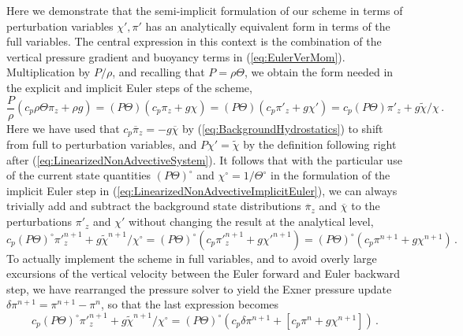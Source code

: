 \documentclass{ametsoc}
\newcommand{\sblue}[1]{\textcolor{sblue}{#1}}
\newcommand{\revision}[1]{\sblue{#1}}
\theoremstyle{definition}
\newcommand{\eq}[1]{(\ref{#1})}
\newcommand{\chibar}{\overline{\chi}}
\newcommand{\chitilde}{{\widetilde \chi}}
\newcommand{\pibar}{\overline{\pi}}
\begin{document}
\begin{appendix}[C]\label{sec:appC}%

\revision{Here we demonstrate that the semi-implicit formulation of our scheme in terms of perturbation variables $\chi', \pi'$ has an analytically equivalent form in terms of the full variables. The central expression in this context is the combination of the vertical pressure gradient and buoyancy terms in \eq{eq:EulerVerMom}. Multiplication by $P/\rho$, and recalling that $P = \rho\Theta$, we obtain the form needed in the explicit and implicit Euler steps of the scheme, 
%
\begin{equation}
\frac{P}{\rho} (c_p \rho\Theta \pi_z + \rho g) 
= (P\Theta) (c_p \pi_z + g\chi) 
= (P\Theta) (c_p \pi'_z + g\chi') 
= c_p (P\Theta) \pi'_z + g \chitilde/\chi\,.
\end{equation}
%
Here we have used that $c_p \pibar_z = -g\chibar$ by \eq{eq:BackgroundHydrostatics} to shift from full to perturbation variables, and $P\chi' = \chitilde$ by the definition following right after \eq{eq:LinearizedNonAdvectiveSystem}. It follows that with the particular use of the current state quantities $(P\Theta)^\circ$ and $\chi^{\circ} = 1/\Theta^{\circ}$ in the formulation of the implicit Euler step in \eq{eq:LinearizedNonAdvectiveImplicitEuler}, we can always trivially add and subtract the background state distributions $\pibar_z$ and $\chibar$ to the perturbations $\pi'_z$ and $\chi'$ without changing the result at the analytical level, 
%
\begin{equation}
c_p (P\Theta)^{\circ} {\pi'}^{n+1}_z + g {\chitilde}^{n+1}/\chi^{\circ} 
= (P\Theta)^{\circ}(c_p {\pi'}^{n+1}_z + g {\chi'}^{n+1}) 
= (P\Theta)^{\circ}(c_p \pi^{n+1} + g \chi^{n+1})\,.
\end{equation}
%
To actually implement the scheme in full variables, and to avoid overly large excursions of the vertical velocity between the Euler forward and Euler backward step, we have rearranged the pressure solver to yield the Exner pressure update $\delta\pi^{n+1} = \pi^{n+1}-\pi^{n}$, so that the last expression becomes
%
\begin{equation}
c_p (P\Theta)^{\circ} {\pi'}^{n+1}_z + g {\chitilde}^{n+1}/\chi^{\circ} 
= (P\Theta)^{\circ}(c_p \delta\pi^{n+1} + \left[c_p\pi^{n} + g \chi^{n+1}\right])\,.
\end{equation}
}
\end{appendix}
\end{document}

